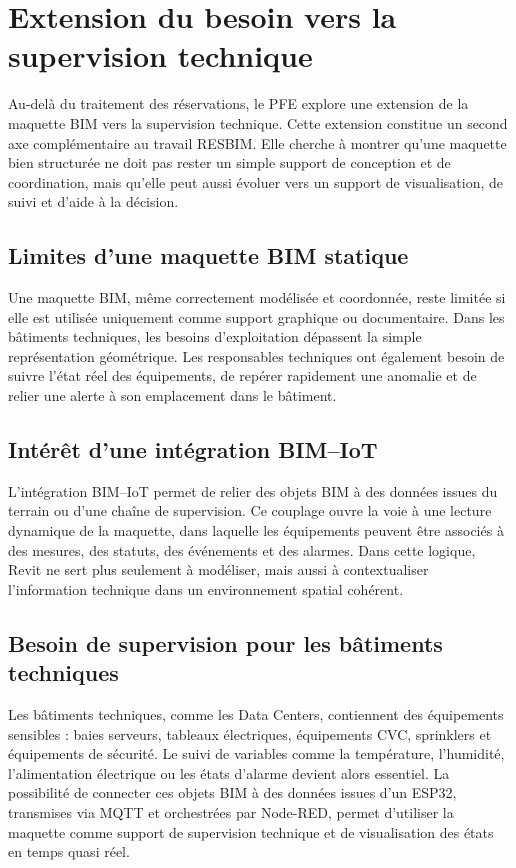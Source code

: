 \documentclass[12pt,a4paper]{report}
\begin{document}
\section{Extension du besoin vers la supervision technique}
Au-delà du traitement des réservations, le PFE explore une extension de la maquette BIM vers la supervision technique. Cette extension constitue un second axe complémentaire au travail RESBIM. Elle cherche à montrer qu'une maquette bien structurée ne doit pas rester un simple support de conception et de coordination, mais qu'elle peut aussi évoluer vers un support de visualisation, de suivi et d'aide à la décision.

\subsection{Limites d'une maquette BIM statique}
Une maquette BIM, même correctement modélisée et coordonnée, reste limitée si elle est utilisée uniquement comme support graphique ou documentaire. Dans les bâtiments techniques, les besoins d'exploitation dépassent la simple représentation géométrique. Les responsables techniques ont également besoin de suivre l'état réel des équipements, de repérer rapidement une anomalie et de relier une alerte à son emplacement dans le bâtiment.

\subsection{Intérêt d'une intégration BIM--IoT}
L'intégration BIM--IoT permet de relier des objets BIM à des données issues du terrain ou d'une chaîne de supervision. Ce couplage ouvre la voie à une lecture dynamique de la maquette, dans laquelle les équipements peuvent être associés à des mesures, des statuts, des événements et des alarmes. Dans cette logique, Revit ne sert plus seulement à modéliser, mais aussi à contextualiser l'information technique dans un environnement spatial cohérent.

\subsection{Besoin de supervision pour les bâtiments techniques}
Les bâtiments techniques, comme les Data Centers, contiennent des équipements sensibles : baies serveurs, tableaux électriques, équipements CVC, sprinklers et équipements de sécurité. Le suivi de variables comme la température, l'humidité, l'alimentation électrique ou les états d'alarme devient alors essentiel. La possibilité de connecter ces objets BIM à des données issues d'un ESP32, transmises via MQTT et orchestrées par Node-RED, permet d'utiliser la maquette comme support de supervision technique et de visualisation des états en temps quasi réel.
\end{document}
